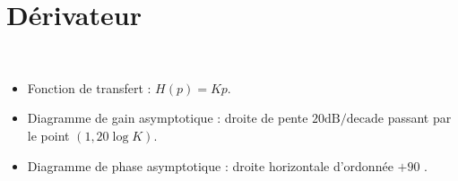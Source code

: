 \documentclass[10pt,fleqn]{article} %
\begin{document}
\section{Dérivateur}
\begin{resultat} ~\\

\vspace{-.5cm}

\noindent\begin{minipage}[c]{.53\linewidth}
\begin{itemize}
\item Fonction de transfert : $H(p)={K}{p}$.
\item Diagramme de gain asymptotique : droite de pente ${20}\text{dB/decade}$ passant par le point $(1,20\log K)$.
\item Diagramme de phase asymptotique : droite horizontale d'ordonnée $+90$ \degre.
\end{itemize}
\end{minipage} \hfill
\begin{minipage}[c]{.45\linewidth}
\end{minipage}
\end{resultat}

\vspace{-.5cm}
\end{document}
